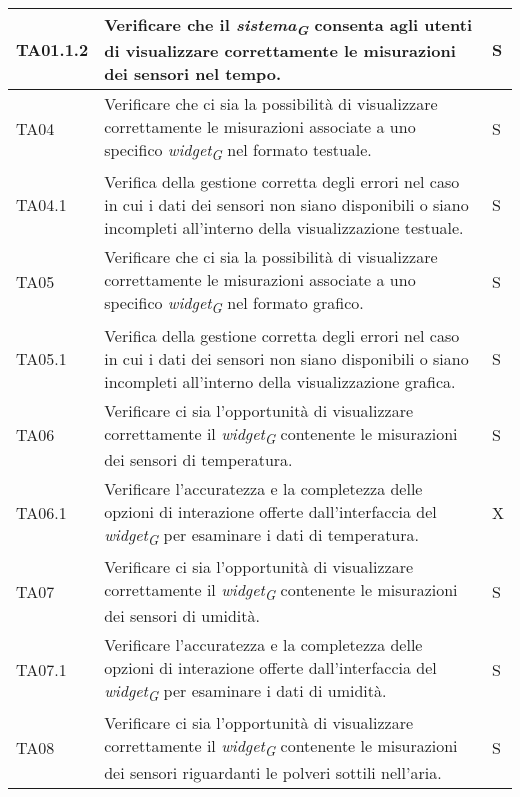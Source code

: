 \begin{longtable}{|C{1.9cm}|L{7cm}|C{2cm}|}
    TA01.1.2 & Verificare che il \textit{sistema}\textsubscript{\textit{G}} consenta agli utenti di visualizzare correttamente le misurazioni dei sensori nel tempo. & S \\
    \hline
    
    TA04 & Verificare che ci sia la possibilità di visualizzare correttamente le misurazioni associate a uno specifico \textit{widget}\textsubscript{\textit{G}} nel formato testuale.  & S \\
    \hline
    
    TA04.1 & Verifica della gestione corretta degli errori nel caso in cui i dati dei sensori non siano disponibili o siano incompleti all'interno della visualizzazione testuale. & S \\
    \hline
    
    TA05 & Verificare che ci sia la possibilità di visualizzare correttamente le misurazioni associate a uno specifico \textit{widget}\textsubscript{\textit{G}} nel formato grafico. & S \\
    \hline
    
    TA05.1 & Verifica della gestione corretta degli errori nel caso in cui i dati dei sensori non siano disponibili o siano incompleti all'interno della visualizzazione grafica. & S \\
    \hline
    
    TA06 & Verificare ci sia l'opportunità di visualizzare correttamente il \textit{widget}\textsubscript{\textit{G}} contenente le misurazioni dei sensori di temperatura. & S \\
    \hline
    
    TA06.1 & Verificare l'accuratezza e la completezza delle opzioni di interazione offerte dall'interfaccia del \textit{widget}\textsubscript{\textit{G}} per esaminare i dati di temperatura. & X \\
    \hline
    
    TA07 & Verificare ci sia l'opportunità di visualizzare correttamente il \textit{widget}\textsubscript{\textit{G}} contenente le misurazioni dei sensori di umidità. & S \\
    \hline
    
    TA07.1 & Verificare l'accuratezza e la completezza delle opzioni di interazione offerte dall'interfaccia del \textit{widget}\textsubscript{\textit{G}} per esaminare i dati di umidità. & S \\
    \hline
    
    TA08 & Verificare ci sia l'opportunità di visualizzare correttamente il \textit{widget}\textsubscript{\textit{G}} contenente le misurazioni dei sensori riguardanti le polveri sottili nell'aria. & S \\
    \hline
    

\end{longtable}
